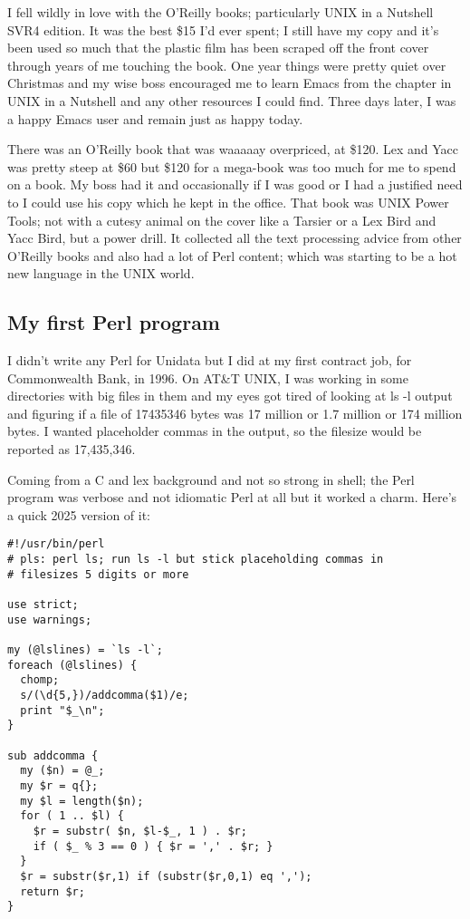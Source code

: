 \documentclass{article}
\begin{document}
I fell wildly in love with the O'Reilly books; particularly UNIX in a
Nutshell SVR4 edition. It was the best \$15 I'd ever spent; I still
have my copy and it's been used so much that the plastic film has been
scraped off the front cover through years of me touching the
book. One year things were pretty quiet over Christmas and my wise
boss encouraged me to learn Emacs from the chapter in UNIX in a
Nutshell and any other resources I could find. Three days later, I was
a happy Emacs user and remain just as happy today.

There was an O'Reilly book that was waaaaay overpriced, at \$120. Lex
and Yacc was pretty steep at \$60 but \$120 for a mega-book was too
much for me to spend on a book. My boss had it and occasionally if I
was good or I had a justified need to I could use his copy which he
kept in the office. That book was UNIX Power Tools; not with a
cutesy animal on the cover like a Tarsier or a Lex Bird and Yacc Bird,
but a power drill. It collected all the text processing advice from
other O'Reilly books and also had a lot of Perl content; which was
starting to be a hot new language in the UNIX world.

\subsection{My first Perl program}

I didn't write any Perl for Unidata but I did at my
first contract job, for Commonwealth Bank, in 1996. On AT\&T UNIX, I
was working in some directories with big files in them and my eyes got
tired of looking at ls -l output and figuring if a file of 17435346
bytes was 17 million or 1.7 million or 174 million bytes. I wanted
placeholder commas in the output, so the filesize would be reported
as 17,435,346.

Coming from a C and lex background and not so strong in shell; the
Perl program was verbose and not idiomatic Perl at all but it worked a
charm. Here's a quick 2025 version of it:

\begin{verbatim}
#!/usr/bin/perl
# pls: perl ls; run ls -l but stick placeholding commas in
# filesizes 5 digits or more

use strict;
use warnings;

my (@lslines) = `ls -l`;
foreach (@lslines) {
  chomp;
  s/(\d{5,})/addcomma($1)/e;
  print "$_\n";
}

sub addcomma {
  my ($n) = @_;
  my $r = q{};
  my $l = length($n);
  for ( 1 .. $l) {
    $r = substr( $n, $l-$_, 1 ) . $r;
    if ( $_ % 3 == 0 ) { $r = ',' . $r; }
  }
  $r = substr($r,1) if (substr($r,0,1) eq ',');
  return $r;
}
\end{verbatim}
\end{document}
